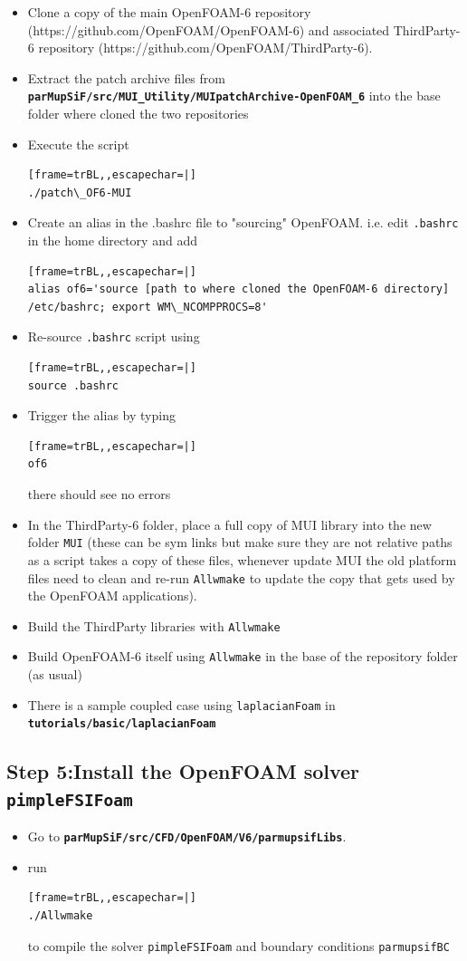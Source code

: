 \documentclass[a4paper, 12pt]{article}
\newcommand{\dir}[1]{{\textbf{\color{blue}\texttt{#1}}}}
\begin{document}
	\begin{itemize}
		\item Clone a copy of the main OpenFOAM-6 repository (https://github.com/OpenFOAM/OpenFOAM-6) and associated ThirdParty-6 repository (https://github.com/OpenFOAM/ThirdParty-6).
		\item Extract the patch archive files from \dir{parMupSiF/src/MUI\_Utility/MUIpatchArchive-OpenFOAM\_6} into the base folder where cloned the two repositories
		\item Execute the script 
\begin{lstlisting}[frame=trBL,,escapechar=|] 
./patch\_OF6-MUI 
\end{lstlisting}
		\item Create an alias in the .bashrc file to "sourcing" OpenFOAM. i.e. edit \verb|.bashrc| in the home directory and add 
\begin{lstlisting}[frame=trBL,,escapechar=|] 
alias of6='source [path to where cloned the OpenFOAM-6 directory]
/etc/bashrc; export WM\_NCOMPPROCS=8' 
\end{lstlisting}
		\item Re-source \verb|.bashrc| script using 
\begin{lstlisting}[frame=trBL,,escapechar=|] 
source .bashrc 
\end{lstlisting}
		\item Trigger the alias by typing  
\begin{lstlisting}[frame=trBL,,escapechar=|] 
of6 
\end{lstlisting} 
		there should see no errors
		\item In the ThirdParty-6 folder, place a full copy of MUI library into the new folder \verb|MUI| (these can be sym links but make sure they are not relative paths as a script takes a copy of these files, whenever update MUI the old platform files need to clean and re-run \verb|Allwmake| to update the copy that gets used by the OpenFOAM applications).
		\item Build the ThirdParty libraries with \verb|Allwmake|
		\item Build OpenFOAM-6 itself using \verb|Allwmake| in the base of the repository folder (as usual)
		\item There is a sample coupled case using \texttt{laplacianFoam} in \\ \dir{tutorials/basic/laplacianFoam}
	\end{itemize}
	
\subsection{Step 5:Install the OpenFOAM solver \texttt{pimpleFSIFoam}}
	\begin{itemize}
		\item Go to \dir{parMupSiF/src/CFD/OpenFOAM/V6/parmupsifLibs}.
		\item run 
\begin{lstlisting}[frame=trBL,,escapechar=|] 
./Allwmake
\end{lstlisting} 
		to compile the solver \texttt{pimpleFSIFoam} and boundary conditions \texttt{parmupsifBC}
	\end{itemize}
\end{document}
